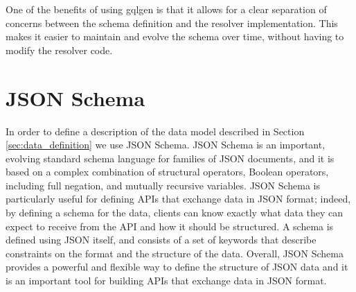 One of the benefits of using gqlgen is that it allows for a clear separation of 
concerns between the schema definition and the resolver implementation. This makes it 
easier to maintain and evolve the schema over time, without having to modify the resolver code.

\section{JSON Schema}

In order to define a description of the data model described in Section \ref{sec:data_definition}
we use JSON Schema. JSON Schema is an important, evolving standard schema language for families of JSON documents, and it is based on a complex combination of structural operators, Boo\-le\-an operators, including full negation,  and mutually recursive variables. JSON Schema is particularly useful for defining APIs that exchange data in JSON 
format; indeed, by defining a schema for the data, clients can know exactly what data 
they can expect to receive from the API and how it should be structured.
A schema is defined using JSON itself, and consists of a set of keywords 
that describe constraints on the  format and the structure of the data. 
Overall, JSON Schema provides a powerful and flexible way to define the structure of 
JSON data and it is an important tool for building APIs that exchange data in JSON format.
